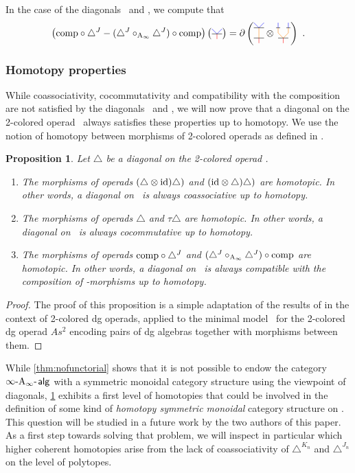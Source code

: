\documentclass[twoside, 11pt]{amsart}
\newtheorem{proposition}[definition]{Proposition}
\theoremstyle{remark}
\begin{document}
\noindent In the case of the diagonals \diagainf\ and \diagminf , we compute that 
  \[ \left( \comp  \circ \diagminf - (\diagminf \circ_{\Ainf} \diagminf ) \circ \comp \right) \left( \arbreopdeuxmorph  \right) = \partial \left( \arbreopcompun \otimes \arbreopcompdeux \right)  \ . \]

\subsubsection{Homotopy properties}

While coassociativity, cocommutativity and compatibility with the composition are not satisfied by the diagonals \diagainf\ and \diagminf , we will now prove that a diagonal on the 2-colored operad \Ainfdeux\ always satisfies these properties up to homotopy.
We use the notion of homotopy between morphisms of 2-colored operads as defined in \cite[Section 3.10]{MSS}. 

\begin{proposition} 
\label{th:homotopy-properties}
Let $\triangle$ be a diagonal on the 2-colored operad \Ainfdeux . 
\begin{enumerate}
    \item The morphisms of operads $(\triangle \otimes \mathrm{id} ) \triangle)$ and $(\mathrm{id} \otimes \triangle) \triangle)$ are homotopic. In other words, a diagonal on \Ainfdeux\ is always coassociative up to homotopy.
    \item The morphisms of operads $\triangle$ and $\tau \triangle$ are homotopic. In other words, a diagonal on \Ainfdeux\ is always cocommutative up to homotopy.
    \item The morphisms of operads $\mathrm{comp}  \circ \triangle^{J}$ and $( \triangle^{J} \circ_{\mathrm{A}_\infty} \triangle^{J} ) \circ \mathrm{comp}$ are homotopic. In other words, a diagonal on \Ainfdeux\ is always compatible with the composition of \Ainf -morphisms up to homotopy.
\end{enumerate}
\end{proposition}

\begin{proof}
The proof of this proposition is a simple adaptation of the results of \cite[Section 2]{MarklShnider06} in the context of 2-colored dg operads, applied to the minimal model \Ainfdeux\ for the 2-colored dg operad $As^2$ encoding pairs of dg algebras together with morphisms between them.
\end{proof}

While \cref{thm:nofunctorial} shows that it is not possible to endow the category $\infty\text{-}\mathrm{A}_\infty\text{-\hspace{1pt}}\mathsf{alg}$ with a symmetric monoidal category structure using the viewpoint of diagonals, \cref{th:homotopy-properties} exhibits a first level of homotopies that could be involved in the definition of some kind of \textit{homotopy symmetric monoidal} category structure on \infAalg . 
This question will be studied in a future work by the two authors of this paper. As a first step towards solving that problem, we will inspect in particular which higher coherent homotopies arise from the lack of coassociativity of $\triangle^{K_n}$ and $\triangle^{J_n}$ on the level of polytopes. 
\end{document}
